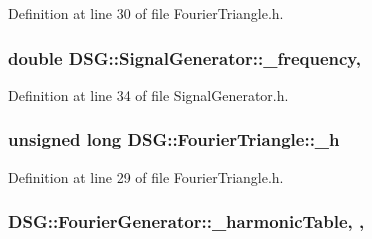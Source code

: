 Definition at line 30 of file Fourier\+Triangle.\+h.

\hypertarget{classDSG_1_1SignalGenerator_a67e296e3506dcdf09402c667cddff9ac}{
\subsubsection[{\+\_\+frequency}]{\setlength{\rightskip}{0pt plus 5cm}double D\+S\+G\+::\+Signal\+Generator\+::\+\_\+frequency\hspace{0.3cm}{\ttfamily [protected]}, {\ttfamily [inherited]}}}\label{classDSG_1_1SignalGenerator_a67e296e3506dcdf09402c667cddff9ac}


Definition at line 34 of file Signal\+Generator.\+h.

\hypertarget{classDSG_1_1FourierTriangle_a855d5d0d221588639f079f463cd2141d}{
\subsubsection[{\+\_\+h}]{\setlength{\rightskip}{0pt plus 5cm}unsigned long D\+S\+G\+::\+Fourier\+Triangle\+::\+\_\+h\hspace{0.3cm}{\ttfamily [protected]}}}\label{classDSG_1_1FourierTriangle_a855d5d0d221588639f079f463cd2141d}


Definition at line 29 of file Fourier\+Triangle.\+h.

\hypertarget{classDSG_1_1FourierGenerator_aedac2cf90997418836d064c90540249d}{
\subsubsection[{\+\_\+harmonic\+Table}]{ D\+S\+G\+::\+Fourier\+Generator\+::\+\_\+harmonic\+Table\hspace{0.3cm}{\ttfamily [static]}, {\ttfamily [protected]}, {\ttfamily [inherited]}}}\label{classDSG_1_1FourierGenerator_aedac2cf90997418836d064c90540249d}


